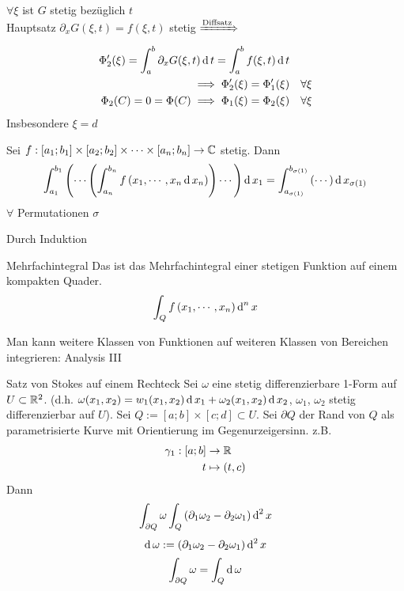 \begin{Bem}
  $\forall \xi$ ist $G$ stetig bezüglich $t$\\
  Hauptsatz $\partial_xG(\xi,t)=f(\xi,t)$ stetig $\xRightarrow{\text{Diffsatz}}$
  \begin{align*}
    \Phi_2'(\xi)=\int^b_a\partial_xG(\xi,t)\operatorname{d} t=\int_a^bf(\xi,t)\operatorname{d} t\\
    \implies \Phi_2'(\xi)=\Phi_1'(\xi)&&\forall \xi\\
    \Phi_2(C)=0=\Phi(C)\implies \Phi_1(\xi)=\Phi_2(\xi)&&\forall \xi
  \end{align*}
  Insbesondere $\xi=d$
\end{Bem}
\begin{Sat}
  Sei $f:\left[ a_1;b_1 \right]\times \left[ a_2;b_2 \right]\times\cdots\times\left[ a_n;b_n \right]\to\mathbb{C}$ stetig. Dann
  \[\int_{a_1}^{b_1}\left( \cdots\left( \int_{a_n}^{b_n}f\left( x_1,\cdots,x_n\operatorname{d} x_n \right)\right)\cdots  \right)\operatorname{d} x_1=\int^{b_{\sigma(1)}}_{a_{\sigma(1)}}\left( \cdots \right)\operatorname{d} x_{\sigma(1)}\]
  $\forall$ Permutationen $\sigma$
\end{Sat}
\begin{Bew}
  Durch Induktion
\end{Bew}
\begin{Def}{Mehrfachintegral}
  Das ist das Mehrfachintegral einer stetigen Funktion auf einem kompakten Quader.
  \[\int_Qf\left( x_1,\cdots,x_n \right)\operatorname{d}^n x\]
\end{Def}
\begin{Bem}
  Man kann weitere Klassen von Funktionen auf weiteren Klassen von Bereichen integrieren: Analysis III
\end{Bem}
\begin{Sat}{Satz von Stokes auf einem Rechteck}
  Sei $\omega$ eine stetig differenzierbare 1-Form auf $U\subset\mathbb{R}^2$. (d.h. $\omega(x_1,x_2)=w_1(x_1,x_2)\operatorname{d} x_1+\omega_2(x_1,x_2)\operatorname{d} x_2$, $\omega_1$, $\omega_2$ stetig differenzierbar auf $U$). Sei $Q:=\left[ a;b \right]\times \left[ c;d \right]\subset U$. Sei $\partial Q$ der Rand von $Q$ als parametrisierte Kurve mit Orientierung im Gegenurzeigersinn. z.B.
  \begin{align*}
    \gamma_1:\left[ a;b \right]&\to\mathbb{R}\\
    t&\mapsto (t,c)
  \end{align*}
  Dann
  \begin{gather*}
    \int_{\partial Q}\omega\int_Q\left( \partial_1\omega_2-\partial_2\omega_1 \right)\operatorname{d}^2 x
  \end{gather*}
  \[\operatorname{d} \omega := \left( \partial_1\omega_2-\partial_2\omega_1 \right)\operatorname{d}^2 x\]
  \[\int_{\partial Q}\omega = \int_Q\operatorname{d} \omega\]
\end{Sat}
